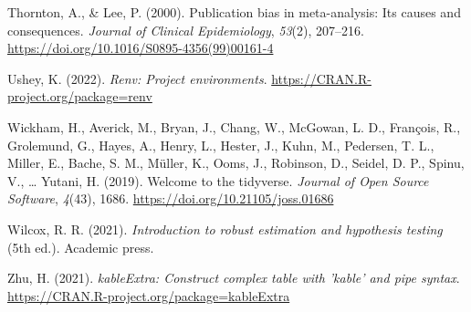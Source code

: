 \documentclass[
  doc, donotrepeattitle,floatsintext]{apa7}
\newlength{\cslhangindent}
\newlength{\cslentryspacingunit} %
\newenvironment{CSLReferences}[2] %
 {%
  \setlength{\parindent}{0pt}
  \ifodd #1
  \let\oldpar\par
  \def\par{\hangindent=\cslhangindent\oldpar}
  \fi
  \setlength{\parskip}{#2\cslentryspacingunit}
 }%
 {}
\begin{document}
\begin{CSLReferences}{1}{0}
\leavevmode{}%
Thornton, A., \& Lee, P. (2000). Publication bias in meta-analysis: Its causes and consequences. \emph{Journal of Clinical Epidemiology}, \emph{53}(2), 207--216. \url{https://doi.org/10.1016/S0895-4356(99)00161-4}

\leavevmode{}%
Ushey, K. (2022). \emph{Renv: Project environments}. \url{https://CRAN.R-project.org/package=renv}

\leavevmode{}%
Wickham, H., Averick, M., Bryan, J., Chang, W., McGowan, L. D., François, R., Grolemund, G., Hayes, A., Henry, L., Hester, J., Kuhn, M., Pedersen, T. L., Miller, E., Bache, S. M., Müller, K., Ooms, J., Robinson, D., Seidel, D. P., Spinu, V., \ldots{} Yutani, H. (2019). Welcome to the {tidyverse}. \emph{Journal of Open Source Software}, \emph{4}(43), 1686. \url{https://doi.org/10.21105/joss.01686}

\leavevmode{}%
Wilcox, R. R. (2021). \emph{Introduction to robust estimation and hypothesis testing} (5th ed.). Academic press.

\leavevmode{}%
Zhu, H. (2021). \emph{kableExtra: Construct complex table with 'kable' and pipe syntax}. \url{https://CRAN.R-project.org/package=kableExtra}

\end{CSLReferences}
\end{document}
